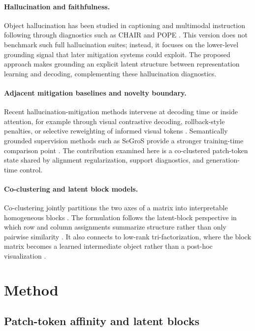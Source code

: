 \documentclass[11pt,a4paper]{article}
\begin{document}
\paragraph{Hallucination and faithfulness.}
Object hallucination has been studied in captioning and multimodal instruction following through diagnostics such as CHAIR and POPE \cite{rohrbach2018object,li2023pope}. This version does not benchmark such full hallucination suites; instead, it focuses on the lower-level grounding signal that later mitigation systems could exploit. The proposed approach makes grounding an explicit latent structure between representation learning and decoding, complementing these hallucination diagnostics.

\paragraph{Adjacent mitigation baselines and novelty boundary.}
Recent hallucination-mitigation methods intervene at decoding time or inside attention, for example through visual contrastive decoding, rollback-style penalties, or selective reweighting of informed visual tokens \cite{leng2024vcd,huang2024opera,arif2025paint}. Semantically grounded supervision methods such as SeGroS provide a stronger training-time comparison point \cite{kim2026segros}. The contribution examined here is a co-clustered patch-token state shared by alignment regularization, support diagnostics, and generation-time control.

\paragraph{Co-clustering and latent block models.}
Co-clustering jointly partitions the two axes of a matrix into interpretable homogeneous blocks \cite{dhillon2003itcc,govaert2013coclustering}. The formulation follows the latent-block perspective in which row and column assignments summarize structure rather than only pairwise similarity \cite{govaert2013coclustering,govaert2008bernoulli,nadif2010continuous,govaert2018mutual}. It also connects to low-rank tri-factorization, where the block matrix becomes a learned intermediate object rather than a post-hoc visualization \cite{ding2006onmtf}.

\section{Method}
\label{sec:method}

\subsection{Patch-token affinity and latent blocks}
\end{document}
